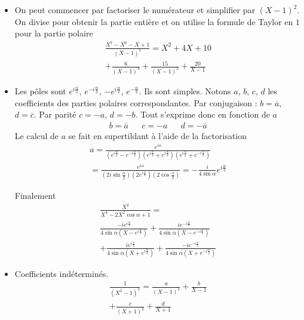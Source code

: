 \begin{itemize}
 \item On peut commencer par factoriser le numérateur et simplifier par $(X-1)^2$. On divise pour obtenir la partie entière et on utilise la formule de Taylor en $1$ pour la partie polaire
\begin{multline*}
 \frac{X^{7}-X^{6}-X+1}{(X-1)^{5}}
= X^2+4X+10 \\
+\frac{6}{(X-1)^3}+\frac{15}{(X-1)^2}+\frac{20}{X-1}
\end{multline*}

 \item Les pôles sont $e^{i\frac{\alpha}{2}}$, $e^{-i\frac{\alpha}{2}}$, $-e^{i\frac{\alpha}{2}}$, $e^{-\frac{\alpha}{2}}$. Ils sont simples. Notons $a$, $b$, $c$, $d$ les coefficients des parties polaires correspondantes. Par conjugaison : $b=\overline{a}$,  $d=\overline{c}$. Par parité $c=-a$, $d=-b$. Tout s'exprime donc en fonction de $a$
\begin{align*}
 b=\overline{a} & & c=-a & &d= -\overline{a}
\end{align*}
Le calcul de $a$ se fait en supertildant à l'aide de la factorisation
\begin{multline*}
 a=\frac{e^{i\alpha}}{
  \left(e^{i\frac{\alpha}{2}}- e^{-i\frac{\alpha}{2}}\right)
  \left(e^{i\frac{\alpha}{2}}+ e^{i\frac{\alpha}{2}}\right)
  \left(e^{i\frac{\alpha}{2}}+ e^{-i\frac{\alpha}{2}}\right)
 }\\
=\frac{e^{i\alpha}}{
\left(2i\sin\frac{\alpha}{2}\right)
\left( 2e^{i\frac{\alpha}{2}}\right) 
\left(2\cos\frac{\alpha}{2}\right) 
}
=-\frac{i}{4\sin \alpha}e^{i\frac{\alpha}{2}}
\end{multline*}

Finalement
\begin{multline*}
\frac{X^{2}}{X^{4}-2X^{2}\cos \alpha +1}=\\
\frac{-ie^{i\frac{\alpha}{2}}}{4\sin \alpha(X-e^{i\frac{\alpha}{2}})}
+\frac{ie^{-i\frac{\alpha}{2}}}{4\sin \alpha(X-e^{-i\frac{\alpha}{2}})} \\
+\frac{ie^{i\frac{\alpha}{2}}}{4\sin \alpha(X+e^{i\frac{\alpha}{2}})}
+\frac{-ie^{-i\frac{\alpha}{2}}}{4\sin \alpha(X+e^{-i\frac{\alpha}{2}})}
\end{multline*}

 \item Coefficients indéterminés.
\begin{multline*}
 \frac{1}{(X^{2}-1)^{2}}=
\frac{a}{(X-1)^2}+\frac{b}{X-1}\\+\frac{c}{(X+1)^2}+\frac{d}{X+1}
\end{multline*}


\end{itemize}
